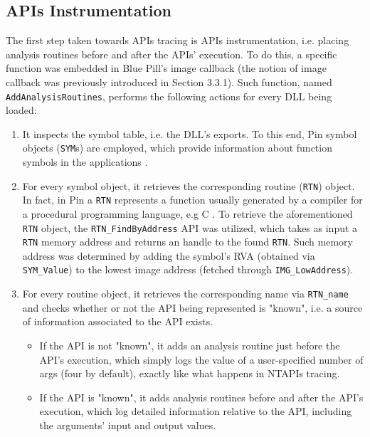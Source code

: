 \subsection{APIs Instrumentation}

The first step taken towards APIs tracing is APIs instrumentation, i.e. placing analysis routines before and after the APIs' execution. To do this, a specific function was embedded in Blue Pill's image callback (the notion of image callback was previously introduced in Section 3.3.1). Such function, named \texttt{AddAnalysisRoutines}, performs the following actions for every DLL being loaded:

\begin{enumerate} 
\item It inspects the symbol table, i.e. the DLL's exports. To this end, Pin symbol objects (\texttt{SYM}s) are employed, which provide information about function symbols in the applications \cite{Pin}.
\item For every symbol object, it retrieves the corresponding routine (\texttt{RTN}) object. In fact, in Pin a \texttt{RTN} represents a function usually generated by a compiler for a procedural programming language, e.g C \cite{Pin}. To retrieve the aforementioned \texttt{RTN} object, the \texttt{RTN\_FindByAddress} API was utilized, which takes as input a \texttt{RTN} memory address and returns an handle to the found \texttt{RTN}. Such memory address was determined by adding the symbol's RVA (obtained via \texttt{SYM\_Value}) to the lowest image address (fetched through \texttt{IMG\_LowAddress}).  
\item For every routine object, it retrieves the corresponding name via \texttt{RTN\_name} and checks whether or not the API being represented is "known", i.e. a source of information associated to the API exists.

\begin{itemize}
\item If the API is not "known", it adds an analysis routine just before the API's execution, which simply logs the value of a user-specified number of args (four by default), exactly like what happens in NTAPIs tracing.
\item If the API is "known", it adds analysis routines before and after the API's execution, which log detailed information relative to the API, including the arguments' input and output values. 
\end{itemize}
 
\end{enumerate}

